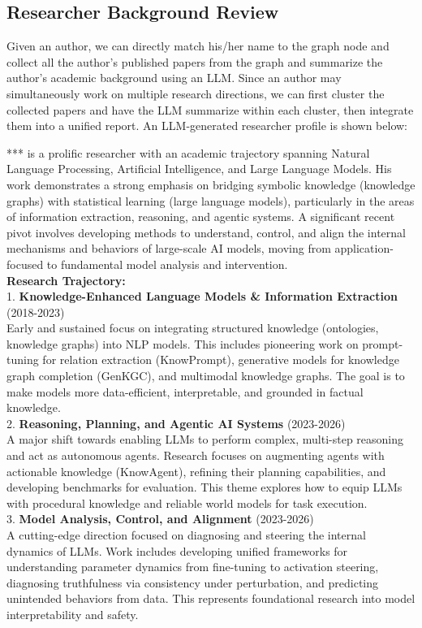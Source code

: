 \documentclass{llmxive}
\begin{document}
\subsection{Researcher Background Review}
Given an author, we can directly match his/her name to the graph node and collect all the author's published papers from the graph and summarize the author's academic background using an LLM.
Since an author may simultaneously work on multiple research directions, we can first cluster the collected papers and have the LLM summarize within each cluster, then integrate them into a unified report.
An LLM-generated researcher profile is shown below:
\begin{tcolorbox}[breakable,colback=persona!20!white, colframe=persona!60!black, title=\textbf{Researcher Background Review}]
    \label{box:author_profile}
    *** is a prolific researcher with an academic trajectory spanning Natural Language Processing, Artificial Intelligence, and Large Language Models. His work demonstrates a strong emphasis on bridging symbolic knowledge (knowledge graphs) with statistical learning (large language models), particularly in the areas of information extraction, reasoning, and agentic systems. A significant recent pivot involves developing methods to understand, control, and align the internal mechanisms and behaviors of large-scale AI models, moving from application-focused to fundamental model analysis and intervention.\\
    \textbf{Research Trajectory:}\\
    1. \textbf{Knowledge-Enhanced Language Models \& Information Extraction} (2018-2023)\\
    Early and sustained focus on integrating structured knowledge (ontologies, knowledge graphs) into NLP models. This includes pioneering work on prompt-tuning for relation extraction (KnowPrompt), generative models for knowledge graph completion (GenKGC), and multimodal knowledge graphs. The goal is to make models more data-efficient, interpretable, and grounded in factual knowledge.\\
    2. \textbf{Reasoning, Planning, and Agentic AI Systems} (2023-2026)\\
    A major shift towards enabling LLMs to perform complex, multi-step reasoning and act as autonomous agents. Research focuses on augmenting agents with actionable knowledge (KnowAgent), refining their planning capabilities, and developing benchmarks for evaluation. This theme explores how to equip LLMs with procedural knowledge and reliable world models for task execution.\\
    3. \textbf{Model Analysis, Control, and Alignment} (2023-2026)\\
    A cutting-edge direction focused on diagnosing and steering the internal dynamics of LLMs. Work includes developing unified frameworks for understanding parameter dynamics from fine-tuning to activation steering, diagnosing truthfulness via consistency under perturbation, and predicting unintended behaviors from data. This represents foundational research into model interpretability and safety.
\end{tcolorbox}
\end{document}
